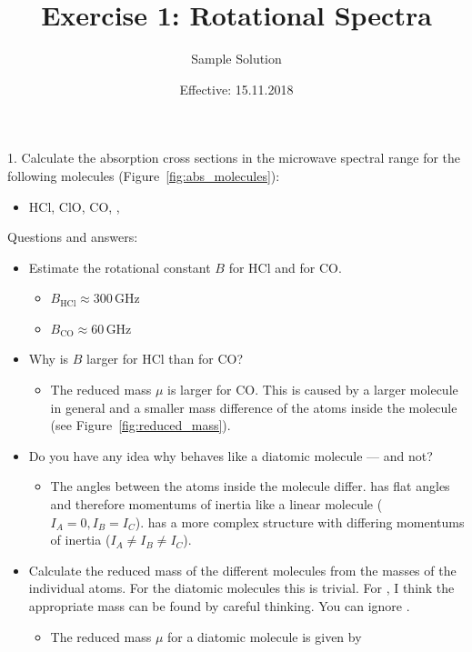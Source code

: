 \documentclass[paper=a4, fontsize=11pt]{scrartcl}
\title{Exercise 1: Rotational Spectra}
\author{Sample Solution}
\date{Effective: 15.11.2018}
\begin{document}
\maketitle

1. Calculate the absorption cross sections in the microwave spectral range for
the following molecules (Figure~\ref{fig:abs_molecules}):
\begin{itemize}
    \item HCl, ClO, CO, , 
\end{itemize}

Questions and answers:
\begin{itemize}
    \item Estimate the rotational constant $B$ for HCl and for CO.
    \begin{itemize}
      \item $B_{\mathrm{HCl}} \approx 300$\,GHz
      \item $B_{\mathrm{CO}} \approx 60$\,GHz
    \end{itemize}
    \item Why is $B$ larger for HCl than for CO?
    \begin{itemize}
        \item The reduced mass $\mu$ is larger for CO. This is caused by a
            larger molecule in general and a smaller mass difference of the
            atoms inside the molecule (see Figure~\ref{fig:reduced_mass}).
    \end{itemize}
    \item Do you have any idea why  behaves like a diatomic molecule
        --- and  not?
    \begin{itemize}
      \item The angles between the atoms inside the molecule differ.
             has flat angles and therefore momentums of inertia like
            a linear molecule ($I_A = 0, I_B = I_C$).  has a more
            complex structure with differing momentums of inertia ($I_A \neq
            I_B \neq I_C$).
    \end{itemize}
    \item Calculate the reduced mass of the different molecules from the masses
        of the individual atoms. For the diatomic molecules this is trivial.
        For , I think the appropriate mass can be found by careful
        thinking. You can ignore .
        \begin{itemize}
          \item The reduced mass $\mu$ for a diatomic molecule is given by

\end{itemize}
\end{itemize}
\end{document}
